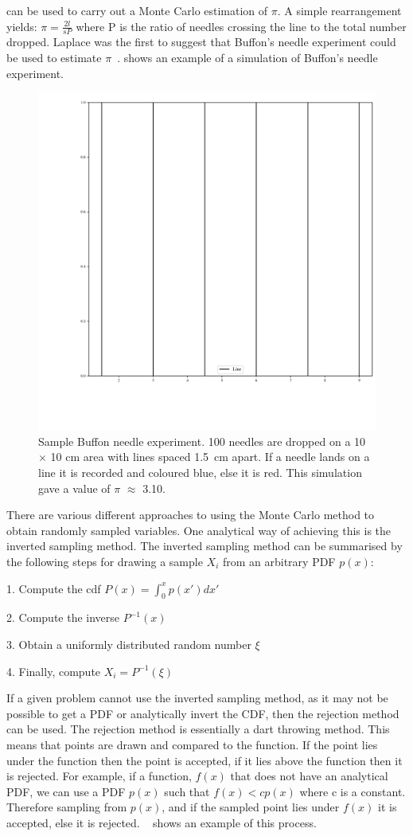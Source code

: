  can be used to carry out a Monte Carlo estimation of $\pi$. A simple rearrangement yields: $\pi = \tfrac{2l}{sP}$ where P is the ratio of needles crossing the line to the total number dropped. Laplace was the first to suggest that Buffon's needle experiment could be used to estimate $\pi$~\cite{beckmann2015history}. 
 shows an example of a simulation of Buffon's needle experiment.

\begin{figure}[!htb]
\centering
\includegraphics[width=.65\textwidth]{buffon.pdf}
\caption{Sample Buffon needle experiment. 100 needles are dropped on a 10 $\times$ 10 cm area with lines spaced 1.5~cm apart. If a needle lands on a line it is recorded and coloured blue, else it is red. This simulation gave a value of $\pi$ $\approx$ 3.10.}
\label{fig:buffon-needle}
\end{figure}

There are various different approaches to using the Monte Carlo method to obtain randomly sampled variables.
One analytical way of achieving this is the inverted sampling method.
The inverted sampling method can be summarised by the following steps for drawing a sample $X_i$ from an arbitrary PDF $p(x)$:

\medskip

1. Compute the \gls*{cdf} $P(x)=\int^{x}_{0}p(x')dx'$

2. Compute the inverse $P^{-1}(x)$

3. Obtain a uniformly distributed random number $\xi$

4. Finally, compute $X_i = P^{-1}(\xi)$

\medskip

If a given problem cannot use the inverted sampling method, as it may not be possible to get a PDF or analytically invert the CDF, then the rejection method can be used.
The rejection method is essentially a dart throwing method.
This means that points are drawn and compared to the function.
If the point lies under the function then the point is accepted, if it lies above the function then it is rejected.
For example, if a function, $f(x)$ that does not have an analytical PDF, we can use a PDF $p(x)$ such that $f(x) < cp(x)$ where c is a constant.
Therefore sampling from $p(x)$, and if the sampled point lies under $f(x)$ it is accepted, else it is rejected.
~ shows an example of this process.

